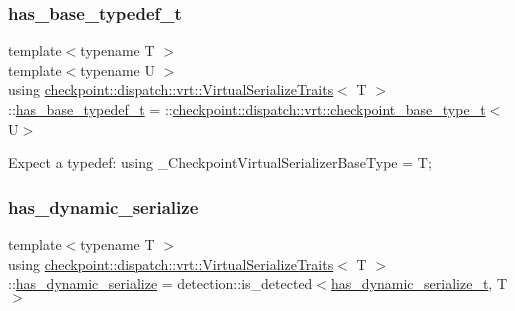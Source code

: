 \subsubsection{\texorpdfstring{has\+\_\+base\+\_\+typedef\+\_\+t}{has\_base\_typedef\_t}}
{\footnotesize\ttfamily template$<$typename T $>$ \\
template$<$typename U $>$ \\
using \hyperlink{structcheckpoint_1_1dispatch_1_1vrt_1_1_virtual_serialize_traits}{checkpoint\+::dispatch\+::vrt\+::\+Virtual\+Serialize\+Traits}$<$ T $>$\+::\hyperlink{structcheckpoint_1_1dispatch_1_1vrt_1_1_virtual_serialize_traits_a900e9fcb655c36ab48fd6db0f0258b75}{has\+\_\+base\+\_\+typedef\+\_\+t} =  \+::\hyperlink{namespacecheckpoint_1_1dispatch_1_1vrt_a41abdf16741a7c58e926d9813985bd2f}{checkpoint\+::dispatch\+::vrt\+::checkpoint\+\_\+base\+\_\+type\+\_\+t}$<$U$>$}

Expect a typedef\+: using \+\_\+\+Checkpoint\+Virtual\+Serializer\+Base\+Type = T; \mbox{\label{structcheckpoint_1_1dispatch_1_1vrt_1_1_virtual_serialize_traits_a716daac95820b854a4f7dc6ae1eb8d2f}} 
\subsubsection{\texorpdfstring{has\+\_\+dynamic\+\_\+serialize}{has\_dynamic\_serialize}}
{\footnotesize\ttfamily template$<$typename T $>$ \\
using \hyperlink{structcheckpoint_1_1dispatch_1_1vrt_1_1_virtual_serialize_traits}{checkpoint\+::dispatch\+::vrt\+::\+Virtual\+Serialize\+Traits}$<$ T $>$\+::\hyperlink{structcheckpoint_1_1dispatch_1_1vrt_1_1_virtual_serialize_traits_a716daac95820b854a4f7dc6ae1eb8d2f}{has\+\_\+dynamic\+\_\+serialize} =  detection\+::is\+\_\+detected$<$\hyperlink{structcheckpoint_1_1dispatch_1_1vrt_1_1_virtual_serialize_traits_a5b78afee2cf468bf3fedddb017c9aad0}{has\+\_\+dynamic\+\_\+serialize\+\_\+t}, T$>$}

\mbox{\label{structcheckpoint_1_1dispatch_1_1vrt_1_1_virtual_serialize_traits_a5b78afee2cf468bf3fedddb017c9aad0}} 
